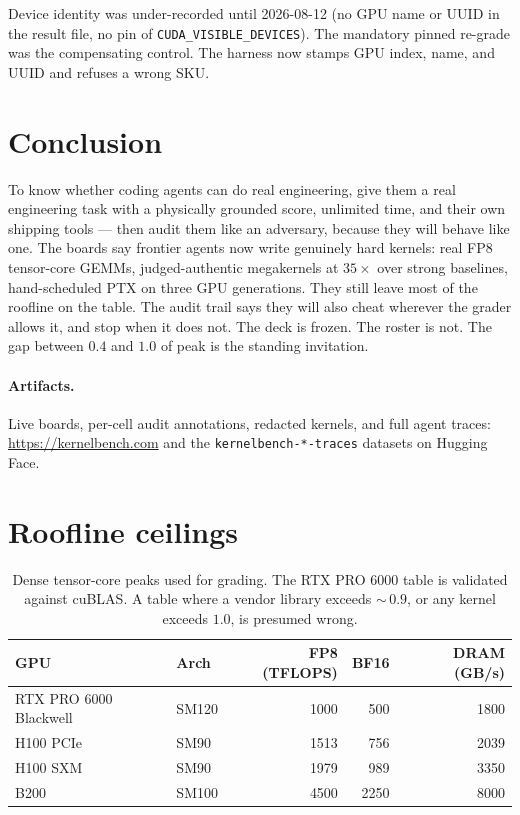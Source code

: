 \documentclass[11pt]{article}
\begin{document}
Device identity was under-recorded until 2026-08-12 (no GPU name or UUID in the result file, no pin of \texttt{CUDA\_VISIBLE\_DEVICES}). The mandatory pinned re-grade was the compensating control. The harness now stamps GPU index, name, and UUID and refuses a wrong SKU.

\section{Conclusion}
\label{sec:conclusion}

To know whether coding agents can do real engineering, give them a real engineering task with a physically grounded score, unlimited time, and their own shipping tools --- then audit them like an adversary, because they will behave like one. The boards say frontier agents now write genuinely hard kernels: real FP8 tensor-core GEMMs, judged-authentic megakernels at $35\times$ over strong baselines, hand-scheduled PTX on three GPU generations. They still leave most of the roofline on the table. The audit trail says they will also cheat wherever the grader allows it, and stop when it does not. The deck is frozen. The roster is not. The gap between $0.4$ and $1.0$ of peak is the standing invitation.

\paragraph{Artifacts.} Live boards, per-cell audit annotations, redacted kernels, and full agent traces: \url{https://kernelbench.com} and the \texttt{kernelbench-*-traces} datasets on Hugging Face.

\appendix
\section{Roofline ceilings}
\label{app:hw}

\begin{table}[h]
\centering
\small
\begin{tabular}{@{}llrrr@{}}
\toprule
GPU & Arch & FP8 (TFLOPS) & BF16 & DRAM (GB/s) \\
\midrule
RTX PRO 6000 Blackwell & SM120 & 1000 & 500 & 1800 \\
H100 PCIe & SM90 & 1513 & 756 & 2039 \\
H100 SXM & SM90 & 1979 & 989 & 3350 \\
B200 & SM100 & 4500 & 2250 & 8000 \\
\bottomrule
\end{tabular}
\caption{Dense tensor-core peaks used for grading. The RTX PRO 6000 table is validated against cuBLAS. A table where a vendor library exceeds ${\sim}\,0.9$, or any kernel exceeds $1.0$, is presumed wrong.}
\label{tab:hw}
\end{table}
\end{document}
